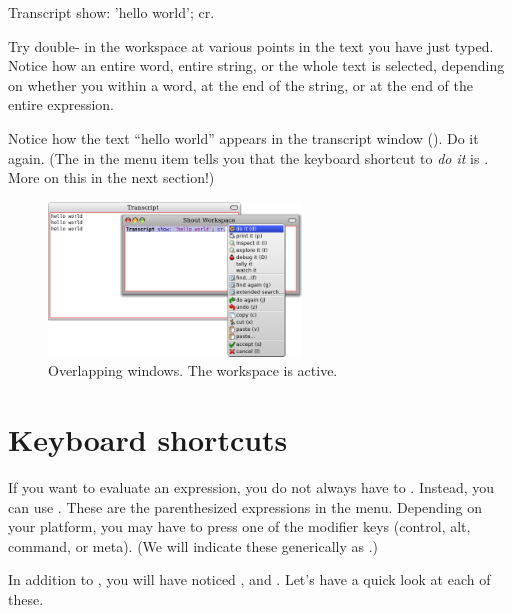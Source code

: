 \documentclass[a4paper,10pt,twoside]{book}
\begin{document}
\begin{code}{}
Transcript show: 'hello world'; cr.
\end{code}

Try double- in the workspace at various points in the text you have just typed.
Notice how an entire word, entire string, or the whole text is selected, depending on whether you \click within a word, at the end of the string, or at the end of the entire expression.

Notice how the text ``hello world'' appears in the transcript window
().
Do it again.
(The  in the menu item  tells you that the keyboard shortcut to \emph{do it} is . More on this in the next section!)

\begin{figure}[htb]
\centerline {\includegraphics[width=0.6\textwidth]{HelloWorld}}
\caption{Overlapping windows. The workspace is active.\label{fig:helloworld}}
\end{figure}

\section{Keyboard shortcuts}

If you want  to evaluate an expression, you do not always have to \actclick. Instead, you can use . These are the parenthesized expressions in the menu.  Depending on your platform, you may have to press one of the modifier keys (control, alt, command, or meta).
(We will indicate these generically as .)


In addition to , you will have noticed ,  and . Let's have a quick look at each of these.
\end{document}
